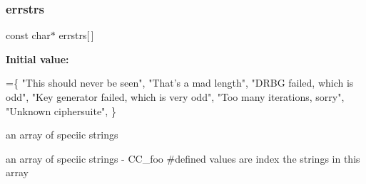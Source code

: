 \subsubsection{\texorpdfstring{errstrs}{errstrs}}
{\footnotesize\ttfamily const char$\ast$ errstrs\mbox{[}$\,$\mbox{]}}

{\bfseries Initial value\+:}
\begin{DoxyCode}
=\{
\textcolor{stringliteral}{"This should never be seen"},
\textcolor{stringliteral}{"That's a mad length"},
\textcolor{stringliteral}{"DRBG failed, which is odd"},
\textcolor{stringliteral}{"Key generator failed, which is very odd"},
\textcolor{stringliteral}{"Too many iterations, sorry"},
\textcolor{stringliteral}{"Unknown ciphersuite"},
\}
\end{DoxyCode}


an array of speciic strings 

an array of speciic strings -\/ C\+C\+\_\+foo \#define\textquotesingle{}d values are index the strings in this array 